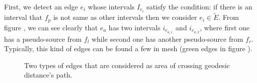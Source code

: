 \documentclass[a4paper,twoside]{article}
\begin{document}
First, we detect an edge $e_i$ whose intervals $I_{e_i}$ satisfy the condition: if there is an interval that $f_p$ is not same as other intervals then we consider $e_i \in \tilde{E}$. From figure , we can see clearly that $e_a$ has two intervals $i_{e_{a,1}}$ and $i_{e_{a,2}}$, where first one has a pseudo-source from $f_l$ while second one has another pseudo-source from $f_r$. Typically, this kind of edges can be found a few in mesh (green edges in figure ). 

\begin{figure}[h!]
	\centering		
	\hspace{0pt}
	
	\caption[]{Two types of edges that are considered as area of crossing geodesic distance's path.}
	\label{fig:fig-two-type-edges}
\end{figure}
\end{document}
